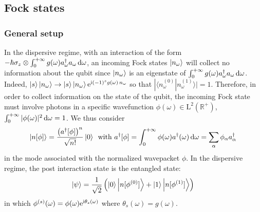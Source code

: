 \subsection{Fock states}
\label{sec/details/quantum}

\subsubsection{General setup}

In the dispersive regime, with an interaction of the form
$-\hbar \sigma_z \otimes \int_0^{+\infty} g(\omega) a^\dagger_\omega
a_\omega \, \mathrm{d} \omega$, an incoming Fock states
$\ket{n_\omega}$ will collect no information
about the qubit since $\ket{n_\omega}$ is an eigenstate of 
$ \int_0^{+\infty} g(\omega) a^\dagger_\omega
a_\omega \, \mathrm{d} \omega$. Indeed,
$\ket{s}\ket{n_\omega} \to
\ket{s}\ket{n_\omega} \mathrm{e}^{\mathrm{i} (-1)^s g(\omega)\,n_\omega}$
so that $|\langle n_\omega^{(0)} | n_\omega^{(1)} \rangle | =1$.
Therefore,  in order to collect information on the state of the qubit,
the incoming Fock state must involve photons in a specific
wavefunction $\phi(\omega) \in \text{L}^2(\mathbb{R}^+)$,
$\int_0^{+\infty} |\phi(\omega)|^2 \, \mathrm{d}\omega =1$.
%
We thus consider 
%
\begin{align}
\ket{n[\phi]} = \frac{\left(a^\dagger[\phi] \right)^n}{\sqrt{n!}}\ket{0}
\, \text{ with }
a^\dagger[\phi] = \int_0^{+\infty} \phi(\omega) a^\dagger(\omega) \,\mathrm{d}\omega
	=\sum_\alpha \phi_\alpha a^\dagger_\alpha
\,
\end{align}
in the mode associated with the normalized wavepacket $\phi$.
In the dispersive regime, the post interaction state is 
the entangled state:
%
\begin{align}
	\ket{\psi}=\frac{1}{\sqrt{2}}\left(
	\ket{0}\ket{n[\phi^{(0)}]} + \ket{1}\ket{n[\phi^{(1)}]}\right)\,
\end{align}
in which
$\phi^{(s)}(\omega) = \phi(\omega) \mathrm{e}^{\mathrm{i}\theta_s(\omega)}$
where $\theta_s(\omega)=g(\omega)$.

